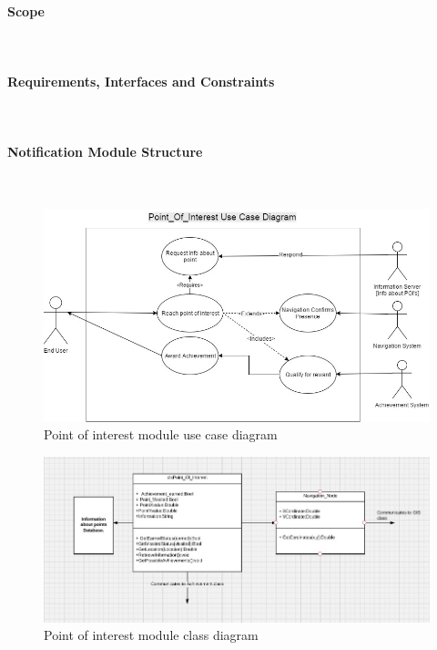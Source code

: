 \documentclass{article}
\begin{document}
				\paragraph {Scope}\mbox{} \\
				\paragraph {Requirements, Interfaces and Constraints}\mbox{} \\
				\paragraph	{Notification Module Structure} \mbox{} \\
			        \begin{figure}[h]
			            \includegraphics[width=\textwidth]{./Images/POI_Usecase.jpg} 
			            \caption{Point of interest module use case diagram}
			        \end{figure}
	
			        \begin{figure}[h]
			            \includegraphics[width=\textwidth]{./Images/POI_Class.jpg} 
			            \caption{Point of interest module class diagram}
			        \end{figure}
\end{document}
